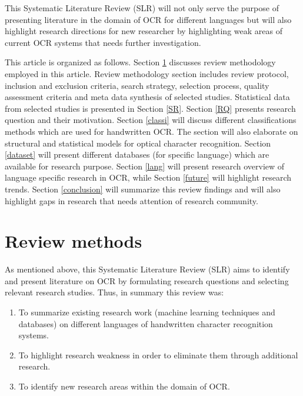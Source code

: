 \documentclass{article}
\begin{document}
This Systematic Literature Review (SLR) will not only serve the purpose of presenting literature in the domain of OCR for different languages but will also highlight research directions for new researcher by highlighting weak areas of current OCR systems that needs further investigation. 

This article is organized as follows. Section \ref{RM} discusses review methodology employed in this article. Review methodology section includes review protocol, inclusion and exclusion criteria, search strategy, selection process, quality assessment criteria and meta data synthesis of selected studies. Statistical data from selected studies is presented in Section \ref{SR}. Section \ref{RQ} presents research question and their motivation. Section \ref{classi} will discuss different classifications methods which are used for handwritten OCR. The section will also elaborate on structural and statistical models for optical character recognition. Section \ref{dataset} will present different databases (for specific language) which are available for research purpose. Section \ref{lang} will present research overview of language specific research in OCR, while Section \ref{future} will highlight research trends. Section \ref{conclusion} will summarize this review findings and will also highlight gaps in research that needs attention of research community.





\section{Review methods} \label{RM}


As mentioned above, this Systematic Literature Review (SLR) aims to identify and present literature on OCR by formulating research questions and selecting relevant research studies. Thus, in summary this review was:


\begin {enumerate}

\item	To summarize existing research work (machine learning techniques and databases) on different languages of handwritten character recognition systems.
\item		To highlight research weakness in order to eliminate them through additional research.  
\item		To identify new research areas within the domain of OCR. 
\end {enumerate}
\end{document}
